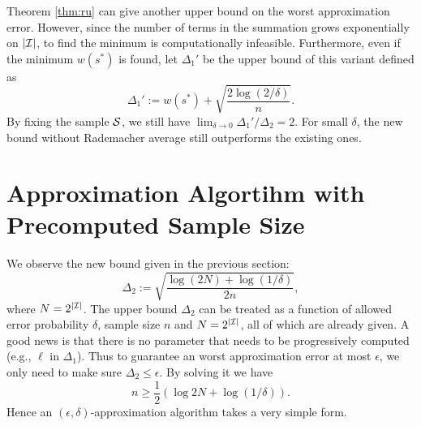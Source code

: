 \documentclass{article}
\begin{document}
Theorem \ref{thm:ru} can give another upper bound on the worst approximation error. However, since the number of terms in the summation grows exponentially on $|\mathcal{I}|$, to find the minimum is computationally infeasible. Furthermore, even if the minimum $w(s^*)$ is found, let $\Delta_1'$ be the upper bound of this variant defined as 
$$\Delta_1' := w(s^*) + \sqrt{\frac{2\log(2/\delta)}{n}}.$$
By fixing the sample $\mathcal{S}$, we still have $\lim_{\delta\to 0}\Delta_1'/\Delta_2 = 2$. For small $\delta$, the new bound without Rademacher average still outperforms the existing ones.

\section{Approximation Algortihm with Precomputed Sample Size}
We observe the new bound given in the previous section:
$$\Delta_2 := \sqrt{\frac{\log(2N) + \log(1/\delta)}{2n}},$$
where $N = 2^{|\mathcal{I}|}$.
The upper bound $\Delta_2$ can be treated as a function of allowed error probability $\delta$, sample size $n$ and $N = 2^{|\mathcal{I}|}$, all of which are already given. A good news is that there is no parameter that needs to be progressively computed (e.g., $\ell$ in $\Delta_1$). Thus to guarantee an worst approximation error at most $\epsilon$, we only need to make sure $\Delta_2 \leq \epsilon$. By solving it we have
$$n \geq \frac{1}{2}(\log 2N + \log (1/\delta)).$$
Hence an $(\epsilon,\delta)$-approximation algorithm takes a very simple form.

\end{document}

